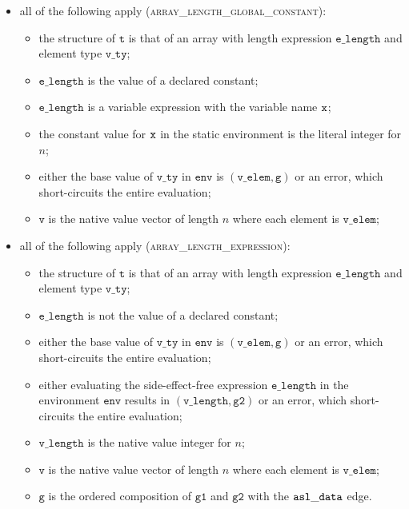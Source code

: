 \documentclass{book}
\newcommand\env[0]{\texttt{env}}
\newcommand\vg[0]{\texttt{g}}
\newcommand\vv[0]{\texttt{v}}
\newcommand\vt[0]{\texttt{t}}
\newcommand\vgone[0]{\texttt{g1}}
\newcommand\vgtwo[0]{\texttt{g2}}
\newcommand\elength[0]{\texttt{e\_length}}
\newcommand\vlength[0]{\texttt{v\_length}}
\newcommand\vvty[0]{\texttt{v\_ty}}
\newcommand\velem[0]{\texttt{v\_elem}}
\begin{document}
\begin{itemize}
  \item all of the following apply (\textsc{array\_length\_global\_constant}):
  \begin{itemize}
    \item the structure of $\vt$ is that of an array with length expression $\elength$ and element type $\vvty$;
    \item $\elength$ is the value of a declared constant;
    \item $\elength$ is a variable expression with the variable name $\texttt{x}$;
    \item the constant value for $\texttt{x}$ in the static environment is the literal integer for $n$;
    \item either the base value of $\vvty$ in $\env$ is $(\velem, \vg)$ or an error, which short-circuits
    the entire evaluation;
    \item $\vv$ is the native value vector of length $n$ where each element is $\velem$;
  \end{itemize}

  \item all of the following apply (\textsc{array\_length\_expression}):
  \begin{itemize}
    \item the structure of $\vt$ is that of an array with length expression $\elength$ and element type $\vvty$;
    \item $\elength$ is not the value of a declared constant;
    \item either the base value of $\vvty$ in $\env$ is $(\velem, \vg)$ or an error, which short-circuits
    the entire evaluation;
    \item either evaluating the side-effect-free expression $\elength$ in the environment $\env$
    results in $(\vlength, \vgtwo)$ or an error, which short-circuits
    the entire evaluation;
    \item $\vlength$ is the native value integer for $n$;
    \item $\vv$ is the native value vector of length $n$ where each element is $\velem$;
    \item $\vg$ is the ordered composition of $\vgone$ and $\vgtwo$ with the $\mathtt{asl\_data}$ edge.
  \end{itemize}
\end{itemize}
\end{document}
